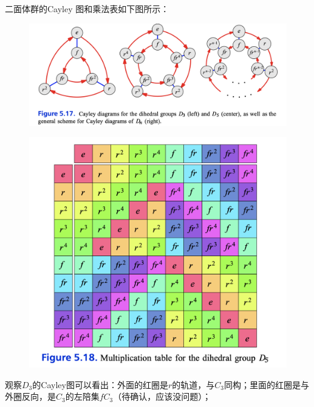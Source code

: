 \documentclass[12pt]{article}
\begin{document}
二面体群的Cayley 图和乘法表如下图所示：
\begin{figure}[H]
    \centering
    \includegraphics[width=1\textwidth]{fig/Group/Cayley-Dihedral-Group-Examples.png}
\end{figure}
\begin{figure}[H]
    \centering
    \includegraphics[width=.8\textwidth]{fig/Group/MultiplicationTable-Dihedral-Group.png}
\end{figure}

观察$D_3$的Cayley图可以看出：外面的红圈是$r$的轨道，与$C_3$同构；里面的红圈是与外圈反向，是$C_3$的左陪集$fC_3$（待确认，应该没问题）；
\end{document}
